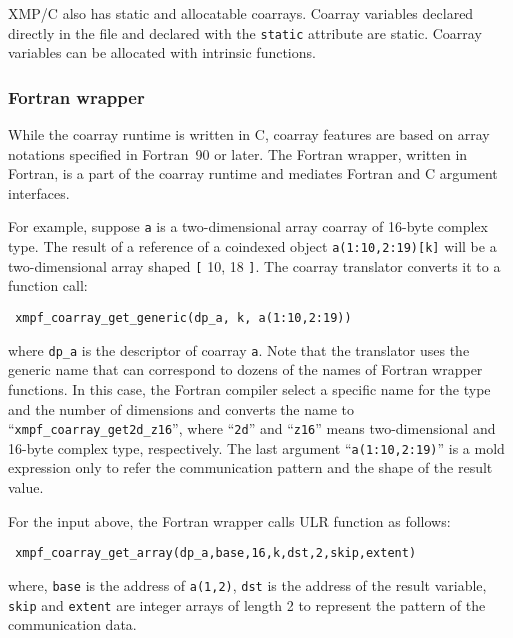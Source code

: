 XMP/C also has static and allocatable coarrays.
Coarray variables declared directly in the file and declared with 
the {\tt static} attribute are static.
Coarray variables can be allocated with intrinsic functions.




\subsubsection{Fortran wrapper}

While the coarray runtime is written in C, coarray features are 
based on array notations specified in Fortran~90 or later.
The Fortran wrapper, written in Fortran, is a part of the coarray runtime 
and mediates Fortran and C argument interfaces.

For example, suppose {\tt a} is a two-dimensional array coarray of 
16-byte complex type. The result of a reference of a coindexed object 
{\tt a(1:10,2:19)[k]} will be a two-dimensional array shaped {\tt [} 10, 18 {\tt ]}. 
The coarray translator converts it to a function call:
\begin{verbatim}
 xmpf_coarray_get_generic(dp_a, k, a(1:10,2:19))
\end{verbatim}
where {\tt dp\_a} is the descriptor of coarray {\tt a}.
%
Note that the translator uses the generic name that can correspond to 
dozens of the names of Fortran wrapper functions. In this case, 
the Fortran compiler select a specific name for the type and the number of 
dimensions and converts the name to ``{\tt xmpf\_coarray\_get2d\_z16}'',
where ``{\tt 2d}'' and ``{\tt z16}'' means two-dimensional and 
16-byte complex type, respectively.
%
The last argument ``{\tt a(1:10,2:19)}'' is a mold expression only to refer
the communication pattern and the shape of the result value.

For the input above, the Fortran wrapper calls ULR function as follows:
\begin{verbatim}
 xmpf_coarray_get_array(dp_a,base,16,k,dst,2,skip,extent)
\end{verbatim}
where, 
%
{\tt base} is the address of {\tt a(1,2)},
%
{\tt dst} is the address of the result variable,
%
{\tt skip} and {\tt extent} are integer arrays of length 2 
to represent the pattern of the communication data.

